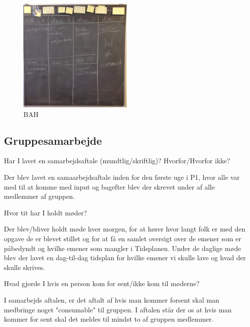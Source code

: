 \documentclass[a4paper,12pt,twoside,openright]{memoir}
\begin{document}
            \begin{figure}[ht!]
                \centering
                \includegraphics[width=0.5\textwidth]{Images/2.jpg}
                \caption{BAH}
                \label{4}
            \end{figure}

        \subsection{Gruppesamarbejde}

Har I lavet en samarbejdsaftale (mundtlig/skriftlig)? Hvorfor/Hvorfor ikke?\newline

Der blev lavet en samaarbejdsaftale inden for den første uge i P1, hvor alle var med til at komme med input og bagefter blev der skrevet under af alle medlemmer af gruppen.\newline

Hvor tit har I holdt møder?\newline

Der blev/bliver holdt møde hver morgen, for at hører hvor langt folk er med den opgave de er blevet stillet og for at få en samlet oversigt over de emener som er påbedyndt og hvilke emener som mangler i Tidsplanen. Under de daglige møde blev der lavet en dag-til-dag tidsplan for hvilke emener vi skulle lave og hvad der skulle skrives.\newline

Hvad gjorde I hvis en person kom for sent/ikke kom til møderne?\newline

I samarbejds aftalen, er det aftalt af hvis man kommer forsent skal man medbringe noget "consumable" til gruppen. I aftalen står der os at hvis man kommer for sent skal det meldes til mindst to af gruppen medlemmer.\newline
\end{document}
